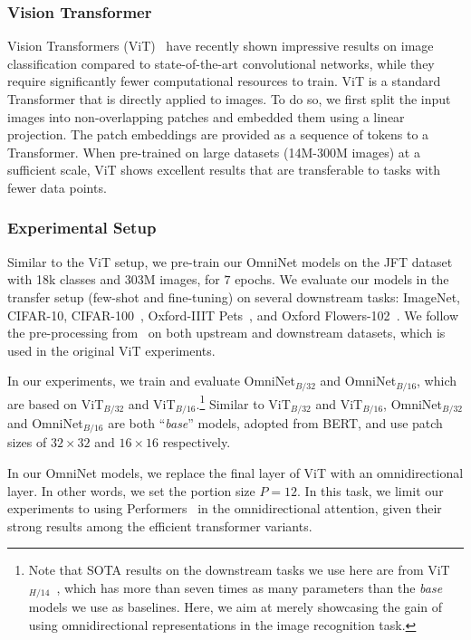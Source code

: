 \documentclass{article}
\begin{document}
\subsubsection{Vision Transformer}
Vision Transformers (ViT)~\citep{dosovitskiy2020image} have recently shown impressive results on image classification compared to state-of-the-art convolutional networks, while they require significantly fewer computational resources to train. ViT is a standard Transformer that is directly applied to images. To do so, we first split the input images into non-overlapping patches and embedded them using a linear projection. The patch embeddings are provided as a sequence of tokens to a Transformer. 
When pre-trained on large datasets (14M-300M images) at a sufficient scale, ViT shows excellent results that are transferable to tasks with fewer data points.


\subsubsection{Experimental Setup}
Similar to the ViT setup, we pre-train our OmniNet models on the JFT dataset~\citep{sun2017revisiting} with 18k classes and 303M images, for $7$ epochs. We evaluate our models in the transfer setup (few-shot and fine-tuning) on several downstream tasks: ImageNet, CIFAR-10, CIFAR-100~\citep{krizhevsky2009learning}, Oxford-IIIT Pets~\citep{parkhi2012cats}, and Oxford Flowers-102~\citep{nilsback2008automated}. We follow the pre-processing from~\citep{kolesnikov2019big} on both upstream and downstream datasets, which is used in the original ViT experiments.

In our experiments, we train and evaluate OmniNet$_{B/32}$ and OmniNet$_{B/16}$, which are based on ViT$_{B/32}$ and ViT$_{B/16}$.\footnote{Note that SOTA results on the downstream tasks we use here are from ViT$_{H/14}$~\citep{dosovitskiy2020image}, which has more than seven times as many parameters than the \textit{base} models we use as baselines. Here, we aim at merely showcasing the gain of using omnidirectional representations in the image recognition task.} 
Similar to ViT$_{B/32}$ and ViT$_{B/16}$, OmniNet$_{B/32}$ and OmniNet$_{B/16}$ are both ``\textit{base}'' models, adopted from BERT, and use patch sizes of $32\times32$ and $16\times16$ respectively. 

In our OmniNet models, we replace the final layer of ViT with an omnidirectional layer. In other words, we set the portion size $P=12$. In this task, we limit our experiments to using Performers~\citep{choromanski2020rethinking} in the omnidirectional attention, given their strong results among the efficient transformer variants.
\end{document}
